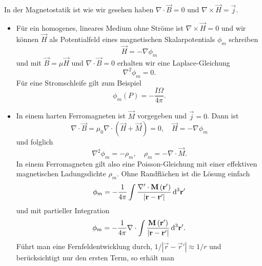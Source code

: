 In der Magnetostatik ist wie wir gesehen haben $\nabla \cdot \vec {B}=0$ und $\nabla \times \vec {H}=\vec {j}$.
\begin{itemize}
	\item Für ein homogenes, lineares Medium ohne Ströme ist $\nabla \times \vec {H}=0$ und wir können $\vec {H}$ als Potentialfeld eines magnetischen Skalarpotentials $\phi _{m}$ schreiben
	      \begin{equation*}
		      \vec {H}=-\nabla \phi _{m}
	      \end{equation*}
	      und mit $\vec {B}=\mu \vec {H}$ und $\nabla \cdot \vec {B}=0$ erhalten wir eine Laplace-Gleichung
	      \begin{equation*}
		      \nabla ^{2}\phi _{m}=0.
	      \end{equation*}
	      Für eine Stromschleife gilt zum Beispiel
	      \begin{equation*}
		      \phi _{m}\left(P\right)=-\frac{I\Omega  }{4\pi }.
	      \end{equation*}
	\item In einem harten Ferromagneten ist $\vec {M}$ vorgegeben und $\vec {j}=0$. Dann ist
	      \begin{equation*}
		      \nabla \cdot \vec {B}=\mu _{0}\nabla \cdot \left(\vec {H}+\vec {M}\right)=0,\quad \vec {H}=-\nabla \phi _{m}
	      \end{equation*}
	      und folglich
	      \begin{equation*}
		      \nabla ^{2}\phi _{m}=-\rho _{m},\quad \rho _{m}=-\nabla \cdot \vec {M}.
	      \end{equation*}
	      In einem Ferromagneten gilt also eine Poisson-Gleichung mit einer effektiven magnetischen Ladungsdichte $\rho _{m}$. Ohne Randflächen ist die Lösung einfach
	      \begin{equation*}
		      \phi _{m}=-\frac{1}{4\pi }\int \frac{\nabla '\cdot \mathbf{M}\left(\mathbf{r}'\right)}{\left| \mathbf{r}-\mathbf{r}'\right| }\mathop{}\!\mathrm{d} ^{3}\mathbf{r}'
	      \end{equation*}
	      und mit partieller Integration
	      \begin{equation*}
		      \phi _{m}=-\frac{1}{4\pi }\nabla \cdot \int \frac{\mathbf{M}\left(\mathbf{r}'\right)}{\left| \mathbf{r}-\mathbf{r}'\right| }\mathop{}\!\mathrm{d} ^{3}\mathbf{r}'.
	      \end{equation*}
	      Führt man eine Fernfeldentwicklung durch, $1/\left| \vec {r}-\vec {r}'\right| \approx 1/r$ und berücksichtigt nur den ersten Term, so erhält man
	      \begin{equation*}

\end{equation*}
\end{itemize}
